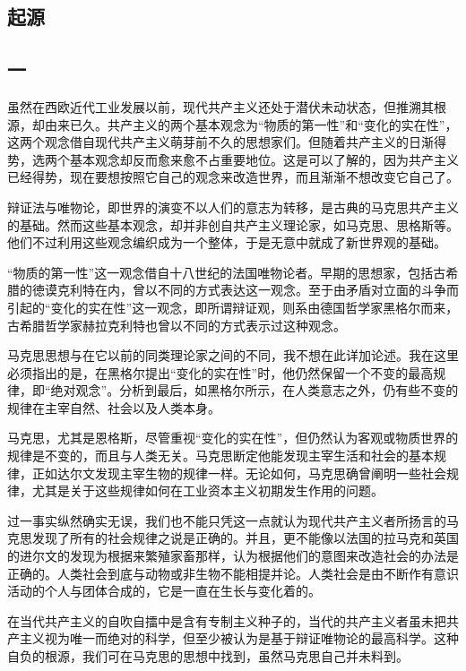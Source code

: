 \documentclass[12pt,oneside]{book}
\begin{document}
\begin{common-format}
\mainmatter

\chapter{起源}
\section{一}
虽然在西欧近代工业发展以前，现代共产主义还处于潜伏未动状态，但推溯其根源，却由来已久。共产主义的两个基本观念为“物质的第一性”和“变化的实在性”，这两个观念借自现代共产主义萌芽前不久的思想家们。但随着共产主义的日渐得势，选两个基本观念却反而愈来愈不占重要地位。这是可以了解的，因为共产主义已经得势，现在要想按照它自己的观念来改造世界，而且渐渐不想改变它自己了。

辩证法与唯物论，即世界的演变不以人们的意志为转移，是古典的马克思共产主义的基础。然而这些基本观念，却并非创自共产主义理论家，如马克思、思格斯等。他们不过利用这些观念编织成为一个整体，于是无意中就成了新世界观的基础。

“物质的第一性”这一观念借自十八世纪的法国唯物论者。早期的思想家，包括古希腊的徳谟克利特在内，曾以不同的方式表达这一观念。至于由矛盾对立面的斗争而引起的“变化的实在性”这一观念，即所谓辩证观，则系由德国哲学家黑格尔而来，古希腊哲学家赫拉克利特也曾以不同的方式表示过这种观念。

马克思思想与在它以前的同类理论家之间的不同，我不想在此详加论述。我在这里必须指出的是，在黑格尔提出“变化的实在性”时，他仍然保留一个不变的最高规律，即“绝对观念”。分析到最后，如黑格尔所示，在人类意志之外，仍有些不变的规律在主宰自然、社会以及人类本身。

马克思，尤其是恩格斯，尽管重视“变化的实在性”，但仍然认为客观或物质世界的规律是不变的，而且与人类无关。马克思断定他能发现主宰生活和社会的基本规律，正如达尔文发现主宰生物的规律一样。无论如何，马克思确曾阐明一些社会规律，尤其是关于这些规律如何在工业资本主义初期发生作用的问题。

过一事实纵然确实无误，我们也不能只凭这一点就认为现代共产主义者所扬言的马克思发现了所有的社会规律之说是正确的。并且，更不能像以法国的拉马克和英国的进尔文的发现为根据来繁殖家畜那样，认为根据他们的意图来改造社会的办法是正确的。人类社会到底与动物或非生物不能相提并论。人类社会是由不断作有意识活动的个人与团体合成的，它是一直在生长与变化着的。

在当代共产主义的自吹自擂中是含有专制主义种子的，当代的共产主义者虽未把共产主义视为唯一而绝对的科学，但至少被认为是基于辩证唯物论的最高科学。这种自负的根源，我们可在马克思的思想中找到，虽然马克思自己并未料到。


\end{common-format}
\end{document}
